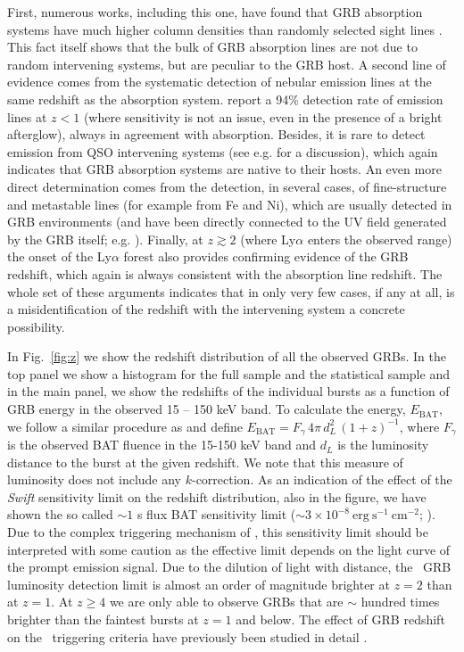 \documentclass[longauth]{aa}    %
\begin{document}
First, numerous works, including this one, have found that GRB absorption
systems have much higher column densities than randomly selected sight lines
\citep{2001ApJ...549L.209G, Savaglio2003,  Prochaska2007, Fynbo2009}. This fact
itself shows that the bulk of GRB absorption lines are not due to random
intervening systems, but are peculiar to the GRB host. A second line of evidence
comes from the systematic detection of nebular emission lines at the same
redshift as the absorption system. \citet{Kruhler2015} report a 94\% detection
rate of emission lines at $z < 1$ (where sensitivity is not an issue, even in
the presence of a bright afterglow), always in agreement with absorption.
Besides, it is rare to detect emission from QSO intervening systems (see e.g.
\citealt{2010MNRAS.408.2128F} for a discussion), which again indicates that GRB
absorption systems are native to their hosts. An even more direct determination
comes from the detection, in several cases, of fine-structure and metastable
lines (for example from Fe and Ni), which are usually detected in GRB
environments (and have been directly connected to the UV field generated by the
GRB itself; e.g. \citealt{2006ApJ...648...95P, Vreeswijk2007, DElia2009}).
Finally, at $z \gtrsim 2$ (where Ly$\alpha$ enters the observed range) the onset
of the Ly$\alpha$ forest also provides confirming evidence of the GRB
redshift, which again is always consistent with the absorption line redshift.
The whole set of these arguments indicates that in only very few cases, if any
at all, is a misidentification of the redshift with the intervening system a
concrete possibility.




In Fig.~\ref{fig:z} we show the redshift distribution of all  the observed GRBs.
In the top panel we show a histogram for the full sample and the statistical
sample and in the main panel, we show the redshifts of the individual bursts as
a function of GRB energy in the observed 15 -- 150 keV band. To calculate the
energy, $E_{\mathrm{BAT}}$, we follow a similar procedure as \citet{Lien2016}
and define $E_{\mathrm{BAT}} = F_{\gamma}\,4 \pi\,d_L^2\,(1+z)^{-1}$, where
$F_{\gamma}$ is the observed BAT fluence in the 15-150 keV band and $d_L$ is the
luminosity distance to the burst at the given redshift. We note that this measure
of luminosity does not include any $k$-correction. As an indication of the
effect of the \textit{Swift} sensitivity limit on the redshift distribution,
also in the figure, we have shown the so called $\sim 1$ s flux BAT sensitivity
limit ($\sim 3 \times 10^{-8}~\mathrm{erg}~\mathrm{s}^{-1}~\mathrm{cm}^{-2}$;
\citealt{Baumgartner2013, Lien2016}). Due to the complex triggering mechanism of
\swift, this sensitivity limit should be interpreted with some caution as the
effective limit depends on the light curve of the prompt emission signal. Due to
the dilution of light with distance, the \swift~GRB luminosity detection limit
is almost an order of magnitude brighter at $z=2$ than at $z=1$. At $z\geq4$ we
are only able to observe GRBs that are $\sim$ hundred times brighter than the
faintest bursts at $z=1$ and below. The effect of GRB redshift on the
\swift~triggering criteria have previously been studied in detail
\citep{Littlejohns2013a}.
\end{document}
